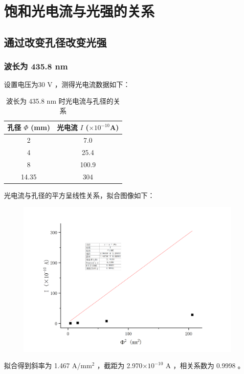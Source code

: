 \documentclass[a4paper]{extarticle}
\begin{document}
    \section{饱和光电流与光强的关系}
    \subsection{通过改变孔径改变光强}
    \subsubsection{波长为 435.8 nm}
    设置电压为30 V ，测得光电流数据如下：
    \begin{table}[H]
        \centering
        \caption{波长为 435.8 nm 时光电流与孔径的关系}
        \begin{tabular}{cc}
            \toprule
            孔径 $\Phi$ (mm) & 光电流 $I$ ($\times10^{-10}$A)\\
            \midrule
            2 & 7.0\\
            4 & 25.4\\
            8 & 100.9\\
            14.35 & 304\\
            \bottomrule
        \end{tabular}
    \end{table}
    光电流与孔径的平方呈线性关系，拟合图像如下：
    \begin{figure}[H]
        \centering
        \includegraphics[width=0.8\linewidth]{3.png}
    \end{figure}
    拟合得到斜率为 1.467 A/mm$^2$ ，截距为 2.970$\times10^{-10}$ A ，相关系数为 0.9998 。
\end{document}
